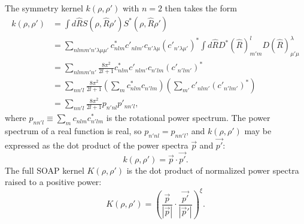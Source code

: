 \documentclass[%
preprint,
amsmath,amssymb,
aps,
]{revtex4-1}
\begin{document}
The symmetry kernel $k(\rho, \rho')$ with $n = 2$ then takes the form
\begin{equation}
    \begin{split}
k(\rho, \rho') &= \int d\hat{R} S(\rho, \hat{R}\rho') S^*(\rho, \hat{R} \rho') \\
&= \sum_{n l m m' n' \lambda \mu \mu'} c^*_{n l m} c'_{n l m'} c_{n' \lambda \mu} (c'_{n' \lambda \mu'})^* \int d\hat{R} D^*(\hat{R})^l_{m' m} D(\hat{R})^\lambda_{\mu' \mu} \\
&= \sum_{n l m m' n'} \frac{8 \pi^2}{2l+1} c^*_{n l m} c'_{n l m'} c_{n' l m} (c'_{n' l m'})^* \\
&= \sum_{n n' l} \frac{8\pi^2}{2l+1} \left(\sum_{m} c^*_{n l m} c_{n' l m} \right) \left(\sum_{m'} c'_{n l m'} (c'_{n' l m'})^* \right) \\
&= \sum_{n n' l} \frac{8\pi^2}{2l+1} p_{n' n l} p'_{n n' l},
    \end{split}
\end{equation}
where $p_{n n' l} \equiv \sum_{m} c_{n l m} c_{n' l m}^*$ is the rotational power spectrum. The power spectrum of a real function is real, so $p_{n' n l} = p_{n n' l}$, and $k(\rho, \rho')$ may be expressed as the dot product of the power spectra $\vec{p}$ and $\vec{p'}$:
\begin{equation}
k(\rho, \rho') = \vec{p} \cdot \vec{p'}.
\end{equation}
The full SOAP kernel $K(\rho, \rho')$ is the dot product of normalized power spectra raised to a positive power:
\begin{equation}
K(\rho, \rho') = \left( \frac{\vec{p}}{|\vec{p}|} \cdot \frac{\vec{p'}}{|\vec{p}'|} \right)^{\xi}.
\end{equation}

\end{document}
